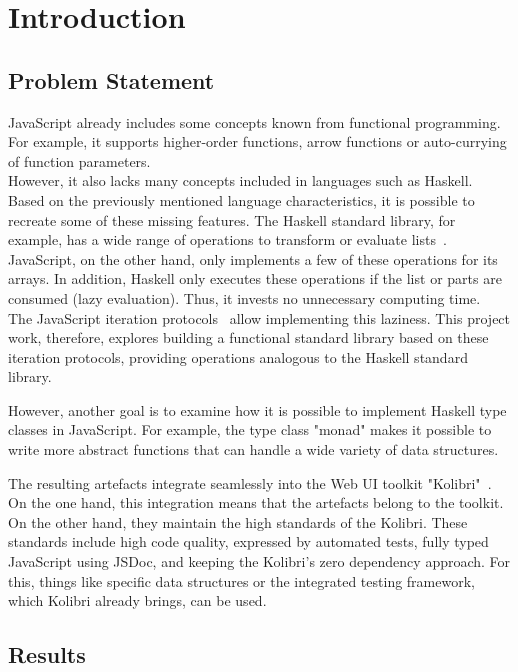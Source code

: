 \chapter{Introduction}
\label{chap:introduction}

\thispagestyle{empty}
\section*{Problem Statement} %
\label{sec:Problem Statement}
JavaScript already includes some concepts known from functional programming.
For example, it supports higher-order functions, arrow functions or
auto-currying of function parameters.\\
However, it also lacks many concepts included in languages such as Haskell. Based on
the previously mentioned language characteristics, it is possible to recreate some of
these missing features. The Haskell standard library, for example, has a wide range of
operations to transform or evaluate lists~\cite{haskell_list}. JavaScript, on the other hand, only
implements a few of these operations for its arrays. In addition, Haskell only
executes these operations if the list or parts are consumed (lazy evaluation).
Thus, it invests no unnecessary computing time.\\
The JavaScript iteration protocols~\cite{mdn_protocols} allow implementing this laziness. This
project work, therefore, explores building a functional standard library based
on these iteration protocols, providing operations analogous to the Haskell
standard library.

However, another goal is to examine how it is possible to implement Haskell
type classes in JavaScript. 
For example, the type class "monad" makes it possible to write more abstract functions that can
handle a wide variety of data structures.

The resulting artefacts integrate seamlessly into the Web UI toolkit
"Kolibri"~\cite{kolibri}. On the one hand, this integration means that the
artefacts belong to the toolkit. On the other hand, they maintain the high
standards of the Kolibri. These standards include high code quality, expressed
by automated tests, fully typed JavaScript using JSDoc, and keeping the
Kolibri's zero dependency approach. For this, things like specific data
structures or the integrated testing framework, which Kolibri already
brings, can be used.

\section*{Results} %
\label{sec:Introduction_Results}

